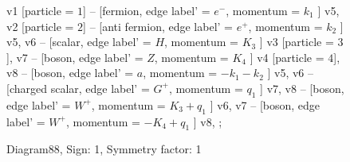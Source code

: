\documentclass{revtex4}
\begin{document}
\begin{figure}[!htb]
\begin{center}
{    %
v1 [particle = \(1\)] -- [fermion, edge label' = \(e^{-}\), momentum = \(k_{1}\) ] v5, 
v2 [particle = \(2\)] -- [anti fermion, edge label' = \(e^{+}\), momentum = \(k_{2}\) ] v5, 
v6 -- [scalar, edge label' = \(H\), momentum = \(K_{3}\) ] v3 [particle = \(3\)], 
v7 -- [boson, edge label' = \(Z\), momentum = \(K_{4}\) ] v4 [particle = \(4\)], 
v8 -- [boson, edge label' = \(a\), momentum = \(-k_{1} - k_{2}\) ] v5, 
v6 -- [charged scalar, edge label' = \(G^{+}\), momentum = \(q_{1}\) ] v7, 
v8 -- [boson, edge label' = \(W^{+}\), momentum = \(K_{3} + q_{1}\) ] v6, 
v7 -- [boson, edge label' = \(W^{+}\), momentum = \(-K_{4} + q_{1}\) ] v8, 
};
\end{center}
\caption{Diagram88, Sign: 1, Symmetry factor: 1}
\end{figure}
\newpage
\end{document}
